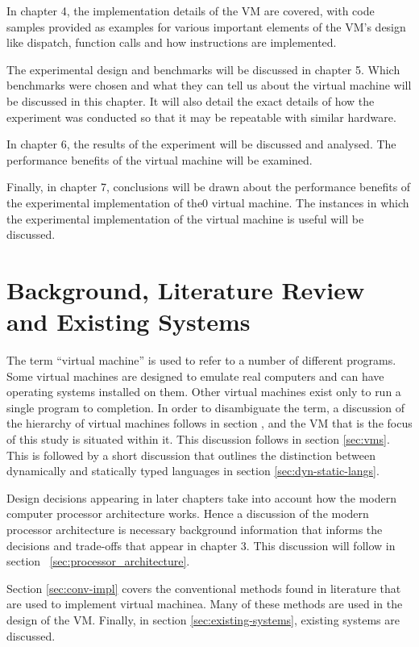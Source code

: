 \documentclass[english,a4paper,12pt]{report}
\begin{document}
In chapter 4, the implementation details of the VM are covered, with
code samples provided as examples for various important elements of
the VM's design like dispatch, function calls and how instructions are
implemented.

The experimental design and benchmarks will be discussed in chapter
5. Which benchmarks were chosen and what they can tell us about the
virtual machine will be discussed in this chapter. It will also detail
the exact details of how the experiment was conducted so that it may
be repeatable with similar hardware.

In chapter 6, the results of the experiment will be discussed and
analysed. The performance benefits of the virtual machine will be
examined. 

Finally, in chapter 7, conclusions will be drawn about the performance
benefits of the experimental implementation of the0 virtual
machine. The instances in which the experimental implementation of the
virtual machine is useful will be discussed.
\newpage{}

\chapter{Background, Literature Review and Existing Systems}
The term ``virtual machine'' is used to refer to a number of different
programs. Some virtual machines are designed to emulate real computers
and can have operating systems installed on them. Other virtual
machines exist only to run a single program to completion. In order to
disambiguate the term, a discussion of the hierarchy of virtual
machines follows in section , and the VM that is the focus of this
study is situated within it. This discussion follows in section
\ref{sec:vms}. This is followed by a short discussion that outlines
the distinction between dynamically and statically typed languages in
section \ref{sec:dyn-static-langs}.

Design decisions appearing in later chapters take into account how the
modern computer processor architecture works. Hence a discussion of
the modern processor architecture is necessary background information
that informs the decisions and trade-offs that appear in chapter
3. This discussion will follow in section
~\ref{sec:processor_architecture}.

Section \ref{sec:conv-impl} covers the conventional methods found in
literature that are used to implement virtual machinea. Many of these
methods are used in the design of the VM. Finally, in section
\ref{sec:existing-systems}, existing systems are discussed.
\end{document}

